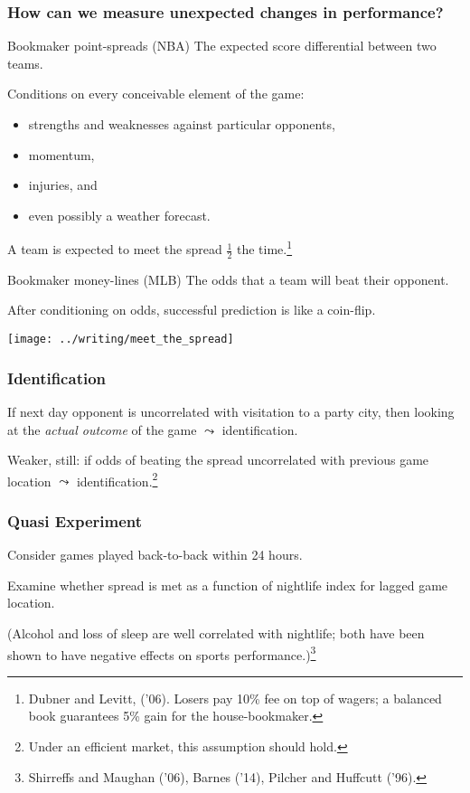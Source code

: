 \documentclass{beamer}
\begin{document}
\begin{frame}
  \frametitle{How can we measure unexpected changes in performance?}     \begin{block}{Bookmaker point-spreads (NBA)}     
    The expected score differential between two teams.

    Conditions on every conceivable element of the game:
    \begin{itemize}     \item strengths and weaknesses against particular opponents,
    \item momentum,
    \item injuries, and
    \item even possibly a weather forecast.     \end{itemize}

    A team is expected to meet the spread $\frac{1}{2}$ the time.\footnote{Dubner and Levitt, ('06). Losers pay 10\% fee on top of wagers; a balanced book guarantees 5\% gain for the house-bookmaker.}
  \end{block}
  \begin{block}{Bookmaker money-lines (MLB)}     The odds that a team will beat their opponent.

    After conditioning on odds, successful prediction is like a coin-flip.   \end{block} \end{frame}

\begin{frame}
  \centering   \texttt{[image: ../writing/meet\_the\_spread]} \end{frame}

\begin{frame}   \frametitle{Identification}
    If next day opponent is uncorrelated with visitation to a party city,
    then looking at the \emph{actual outcome} of the game $\leadsto$ identification.

\vspace{15pt} 
    
    Weaker, still: if odds of beating the spread uncorrelated with previous game location
    $\leadsto$ identification.\footnote{Under an efficient market, this assumption should hold.}     \end{frame}

\begin{frame}   \frametitle{Quasi Experiment}
  Consider games played back-to-back within 24 hours.  
  
  \vspace{12pt}
  Examine whether spread is met as a function of nightlife index for lagged game location.

  \vspace{12pt} (Alcohol and loss of sleep are well correlated with nightlife; both have been shown to have negative effects on sports performance.)\footnote{Shirreffs and Maughan ('06), Barnes ('14), Pilcher and Huffcutt ('96).} \end{frame}
\end{document}
